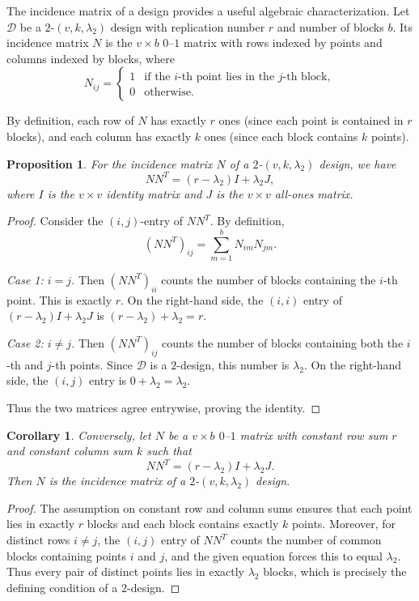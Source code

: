 \documentclass[12pt,a4paper,openany]{book}
\newtheorem{proposition}{Proposition}[section]
\newtheorem{corollary}{Corollary}[section]
\begin{document}
The incidence matrix of a design provides a useful algebraic characterization.  
Let $\mathcal{D}$ be a $2$-$(v,k,\lambda_2)$ design with replication number $r$ and number of blocks $b$.  
Its incidence matrix $N$ is the $v \times b$ $0$–$1$ matrix with rows indexed by points and columns indexed by blocks, where
\[
N_{ij} = \begin{cases}
1 & \text{if the $i$-th point lies in the $j$-th block}, \\
0 & \text{otherwise}.
\end{cases}
\]

By definition, each row of $N$ has exactly $r$ ones (since each point is contained in $r$ blocks), and each column has exactly $k$ ones (since each block contains $k$ points).  

\begin{proposition}
For the incidence matrix $N$ of a $2$-$(v,k,\lambda_2)$ design, we have
\[
N N^T = (r - \lambda_2) I + \lambda_2 J,
\]
where $I$ is the $v \times v$ identity matrix and $J$ is the $v \times v$ all-ones matrix.
\end{proposition}

\begin{proof}
Consider the $(i,j)$-entry of $N N^T$.  
By definition,
\[
(N N^T)_{ij} = \sum_{m=1}^b N_{im} N_{jm}.
\]

\emph{Case 1: $i=j$.}  
Then $(N N^T)_{ii}$ counts the number of blocks containing the $i$-th point.  
This is exactly $r$.  
On the right-hand side, the $(i,i)$ entry of $(r-\lambda_2)I + \lambda_2 J$ is $(r-\lambda_2) + \lambda_2 = r$.  

\emph{Case 2: $i \neq j$.}  
Then $(N N^T)_{ij}$ counts the number of blocks containing both the $i$-th and $j$-th points.  
Since $\mathcal{D}$ is a $2$-design, this number is $\lambda_2$.  
On the right-hand side, the $(i,j)$ entry is $0 + \lambda_2 = \lambda_2$.  

Thus the two matrices agree entrywise, proving the identity.
\end{proof}

\begin{corollary}
Conversely, let $N$ be a $v \times b$ $0$–$1$ matrix with constant row sum $r$ and constant column sum $k$ such that
\[
N N^T = (r - \lambda_2) I + \lambda_2 J.
\]
Then $N$ is the incidence matrix of a $2$-$(v,k,\lambda_2)$ design.
\end{corollary}

\begin{proof}
The assumption on constant row and column sums ensures that each point lies in exactly $r$ blocks and each block contains exactly $k$ points.  
Moreover, for distinct rows $i \neq j$, the $(i,j)$ entry of $N N^T$ counts the number of common blocks containing points $i$ and $j$, and the given equation forces this to equal $\lambda_2$.  
Thus every pair of distinct points lies in exactly $\lambda_2$ blocks, which is precisely the defining condition of a $2$-design.
\end{proof}
\end{document}

